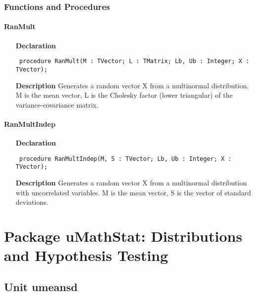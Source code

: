 \documentclass[12pt,a4paper,oneside]{report}
\newcommand{\declarationitem}[1]{\textbf{#1}}
\newcommand{\descriptiontitle}[1]{\textbf{#1}}
\newcommand{\code}[1]{\texttt{#1}}
\begin{document}
\subsection{Functions and Procedures}
\subsubsection{RanMult}
\label{uranmult-RanMult}
\begin{itemize}\item[\declarationitem{Declaration}\hfill]
	\begin{flushleft}
		\code{
			procedure RanMult(M : TVector; L : TMatrix; Lb, Ub : Integer; X : TVector);}
		
	\end{flushleft}
	
	\par
	\item[\descriptiontitle{Description}]
	Generates a random vector X from a multinormal distribution. M is the mean vector, L is the Cholesky factor (lower triangular) of the variance{-}covariance matrix.
	
\end{itemize}
\subsubsection{RanMultIndep}
\label{uranmult-RanMultIndep}
\begin{itemize}\item[\declarationitem{Declaration}\hfill]
	\begin{flushleft}
		\code{
			procedure RanMultIndep(M, S : TVector; Lb, Ub : Integer; X : TVector);}
		
	\end{flushleft}
	
	\par
	\item[\descriptiontitle{Description}]
	Generates a random vector X from a multinormal distribution with uncorrelated variables. M is the mean vector, S is the vector of standard deviations.
	
\end{itemize}


\chapter{Package uMathStat: Distributions and Hypothesis Testing}\label{package-umathstat}
\section{Unit umeansd}
\label{umeansd}
\end{document}
